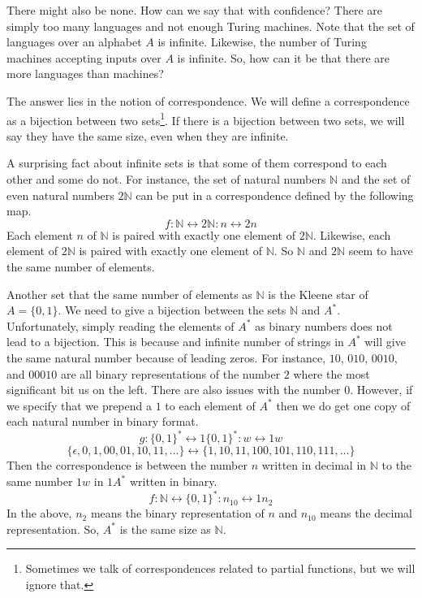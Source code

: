 \documentclass{iansnotes}
\begin{document}
  There might also be none.
  How can we say that with confidence?
  There are simply too many languages and not enough Turing machines.
  Note that the set of languages over an alphabet $A$ is infinite.
  Likewise, the number of Turing machines accepting inputs over $A$ is infinite.
  So, how can it be that there are more languages than machines?

  The answer lies in the notion of correspondence.
  We will define a correspondence as a bijection between two sets\footnote{Sometimes we talk of correspondences related to partial functions, but we will ignore that.}.
  If there is a bijection between two sets, we will say they have the same size, even when they are infinite.

  A surprising fact about infinite sets is that some of them correspond to each other and some do not.
  For instance, the set of natural numbers $\mathbb{N}$ and the set of even natural numbers $2\mathbb{N}$ can be put in a correspondence defined by the following map.
  $$f:\mathbb{N} \leftrightarrow 2\mathbb{N}: n \leftrightarrow 2n$$
  Each element $n$ of $\mathbb{N}$ is paired with exactly one element of $2\mathbb{N}$.
  Likewise, each element of $2\mathbb{N}$ is paired with exactly one element of $\mathbb{N}$.
  So $\mathbb{N}$ and $2\mathbb{N}$ seem to have the same number of elements.

  Another set that the same number of elements as $\mathbb{N}$ is the Kleene star of $A=\{0,1\}$.
  We need to give a bijection between the sets $\mathbb{N}$ and $A^*$.
  Unfortunately, simply reading the elements of $A^*$ as binary numbers does not lead to a bijection.
  This is because and infinite number of strings in $A^*$ will give the same natural number because of leading zeros.
  For instance, $10$, $010$, $0010$, and $00010$ are all binary representations of the number $2$ where the most significant bit us on the left.
  There are also issues with the number $0$.
  However, if we specify that we prepend a $1$ to each element of $A^*$ then we do get one copy of each natural number in binary format.
  $$g:\{0,1\}^*\leftrightarrow1\{0,1\}^*: w \leftrightarrow 1w$$
  $$\{\epsilon, 0, 1, 00, 01, 10, 11, \ldots\} \leftrightarrow \{ 1, 10, 11, 100, 101, 110, 111, \ldots \}$$
  Then the correspondence is between the number $n$ written in decimal in $\mathbb{N}$ to the same number $1w$ in $1A^*$ written in binary.
  $$f:\mathbb{N} \leftrightarrow \{0,1\}^*:n_{10} \leftrightarrow 1n_2 $$
  In the above, $n_2$ means the binary representation of $n$ and $n_{10}$ means the decimal representation.
  So, $A^*$ is the same size as $\mathbb{N}$.
  
\end{document}
